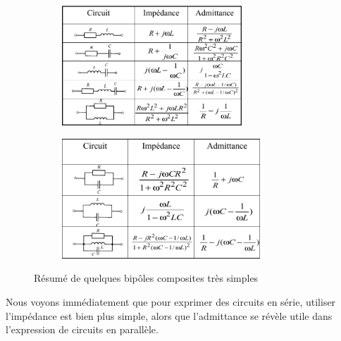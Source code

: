 \documentclass[12pt,a4paper]{article}
\begin{document}
\begin{figure}[!h]
	\centering
	\begin{subfigure}[b]{0.45\textwidth}
		\centering
		\includegraphics[height=4.5cm]{images/bipoles_impedance}
	\end{subfigure}
	\begin{subfigure}[b]{0.45\textwidth}
		\centering
		\includegraphics[height=4.5cm]{images/bipoles_impedance2}
	\end{subfigure}
	\caption{Résumé de quelques bipôles composites très simples}
	\label{figs: resume bipole composite}
\end{figure}
Nous voyons immédiatement que pour exprimer des circuits en série, utiliser l'impédance est bien plus simple, alors que l'admittance se révèle utile dans l'expression de circuits en parallèle. 
\end{document}
